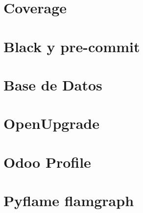 \documentclass[letterpaper,10pt,spanish]{sphinxmanual}
\begin{document}
\section{Coverage}
\label{\detokenize{tecnico/tests-y-ci/coverage:coverage}}\label{\detokenize{tecnico/tests-y-ci/coverage:id1}}\label{\detokenize{tecnico/tests-y-ci/coverage::doc}}

\section{Black y pre-commit}
\label{\detokenize{tecnico/tests-y-ci/black-y-pre-commit:black-y-pre-commit}}\label{\detokenize{tecnico/tests-y-ci/black-y-pre-commit:id1}}\label{\detokenize{tecnico/tests-y-ci/black-y-pre-commit::doc}}


\section{Base de Datos}
\label{\detokenize{tecnico/base-de-datos:base-de-datos}}\label{\detokenize{tecnico/base-de-datos:id1}}\label{\detokenize{tecnico/base-de-datos::doc}}


\section{OpenUpgrade}
\label{\detokenize{tecnico/openupgrade:openupgrade}}\label{\detokenize{tecnico/openupgrade:id1}}\label{\detokenize{tecnico/openupgrade::doc}}


\section{Odoo Profile}
\label{\detokenize{tecnico/herramientas-de-rendimiento/odoo-profile:odoo-profile}}\label{\detokenize{tecnico/herramientas-de-rendimiento/odoo-profile:id1}}\label{\detokenize{tecnico/herramientas-de-rendimiento/odoo-profile::doc}}

\section{Pyflame flamgraph}
\label{\detokenize{tecnico/herramientas-de-rendimiento/pyflame-flamegraph:pyflame-flamgraph}}\label{\detokenize{tecnico/herramientas-de-rendimiento/pyflame-flamegraph:pyflame-flamegraph}}\label{\detokenize{tecnico/herramientas-de-rendimiento/pyflame-flamegraph::doc}}
\end{document}
